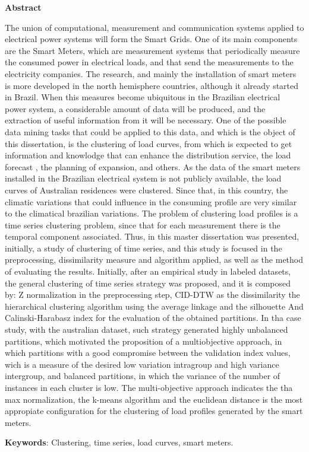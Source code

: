 \begin{center}
  \large{\textbf{Abstract}}
\end{center}


The union of computational, measurement and communication systems applied to electrical power systems will form the Smart Grids. One of its main components are the Smart Meters, which are measurement systems that periodically measure the consumed power in electrical loads, and that send the measurements to the electricity companies. The research, and mainly the installation of smart meters is more developed in the north hemisphere countries, although it already started in Brazil. When this measures become ubiquitous in the Brazilian electrical power system, a considerable amount of data will be produced, and the extraction of useful information from it will be necessary. One of the possible data mining tasks that could be applied to this data, and which is the object of this dissertation, is the clustering of load curves, from which is expected to get information and knowlodge that can enhance the distribution service, the load forecast , the planning of expansion, and others. As the data of the smart meters installed in the Brazilian electrical system is not publicly available, the load curves of Australian residences were clustered. Since that, in this country, the climatic variations that could influence in the consuming profile are very similar to the climatical brazilian variations. The problem of clustering load profiles is a time series clustering problem, since that for each measurement there is the temporal component associated. Thus, in this master dissertation was presented, initially, a study of clustering of time series, and this study is focused in the preprocessing, dissimilarity measure and algorithm applied, as well as the method of evaluating the results. Initially, after an empirical study in labeled datasets, the general clustering of time series strategy was proposed, and it is composed by: Z normalization in the preprocessing step, CID-DTW as the dissimilarity the hierarchical clustering algorithm using the average linkage and the silhouette And Calinski-Harabasz index for the evaluation of the obtained partitions. In tha case study, with the australian dataset, such strategy generated highly unbalanced partitions, which motivated the proposition of a multiobjective approach, in which partitions with a good compromise between the validation index values, wich is a measure of the desired low variation intragroup and high variance intergroup, and balanced partitions, in which the variance of the number of instances in each cluster is low. The multi-objective approach indicates the tha max normalization, the k-means algorithm and the euclidean distance is the most appropiate configuration for the clustering of load profiles generated by the smart meters.

\vspace{.5cm}
\textbf{Keywords}:
Clustering, time series, load curves, smart meters.
